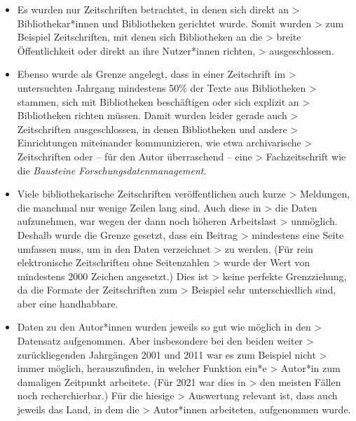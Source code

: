 \documentclass[a4paper,
fontsize=11pt,
oneside,
numbers=noperiodatend,
parskip=half-,
bibliography=totoc,
final
]{scrartcl}
\begin{document}
\begin{itemize}
\item
  Es wurden nur Zeitschriften betrachtet, in denen sich direkt an
  \textgreater{} Bibliothekar*innen und Bibliotheken gerichtet wurde.
  Somit wurden \textgreater{} zum Beispiel Zeitschriften, mit denen sich
  Bibliotheken an die \textgreater{} breite Öffentlichkeit oder direkt
  an ihre Nutzer*innen richten, \textgreater{} ausgeschlossen.
\item
  Ebenso wurde als Grenze angelegt, dass in einer Zeitschrift im
  \textgreater{} untersuchten Jahrgang mindestens 50\% der Texte aus
  Bibliotheken \textgreater{} stammen, sich mit Bibliotheken
  beschäftigen oder sich explizit an \textgreater{} Bibliotheken richten
  müssen. Damit wurden leider gerade auch \textgreater{} Zeitschriften
  ausgeschlossen, in denen Bibliotheken und andere \textgreater{}
  Einrichtungen miteinander kommunizieren, wie etwa archivarische
  \textgreater{} Zeitschriften oder -- für den Autor überraschend --
  eine \textgreater{} Fachzeitschrift wie die \emph{Bausteine
  Forschungsdatenmanagement}.
\item
  Viele bibliothekarische Zeitschriften veröffentlichen auch kurze
  \textgreater{} Meldungen, die manchmal nur wenige Zeilen lang sind.
  Auch diese in \textgreater{} die Daten aufzunehmen, war wegen der dann
  noch höheren Arbeitslast \textgreater{} unmöglich. Deshalb wurde die
  Grenze gesetzt, dass ein Beitrag \textgreater{} mindestens eine Seite
  umfassen muss, um in den Daten verzeichnet \textgreater{} zu werden.
  (Für rein elektronische Zeitschriften ohne Seitenzahlen \textgreater{}
  wurde der Wert von mindestens 2000 Zeichen angesetzt.) Dies ist
  \textgreater{} keine perfekte Grenzziehung, da die Formate der
  Zeitschriften zum \textgreater{} Beispiel sehr unterschiedlich sind,
  aber eine handhabbare.
\item
  Daten zu den Autor*innen wurden jeweils so gut wie möglich in den
  \textgreater{} Datensatz aufgenommen. Aber insbesondere bei den beiden
  weiter \textgreater{} zurückliegenden Jahrgängen 2001 und 2011 war es
  zum Beispiel nicht \textgreater{} immer möglich, herauszufinden, in
  welcher Funktion ein*e \textgreater{} Autor*in zum damaligen Zeitpunkt
  arbeitete. (Für 2021 war dies in \textgreater{} den meisten Fällen
  noch recherchierbar.) Für die hiesige \textgreater{} Auswertung
  relevant ist, dass auch jeweils das Land, in dem die \textgreater{}
  Autor*innen arbeiteten, aufgenommen wurde.
\end{itemize}
\end{document}
